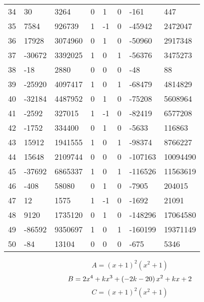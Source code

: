 \documentclass{amsart}
\begin{document}
\begin{longtable}{|l|l|l|lllll|}
34&30&3264&0&1&0&-161&447\\
35&7584&926739&1&-1&0&-45942&2472047\\
36&17928&3074960&0&1&0&-50960&2917348\\
37&-30672&3392025&1&0&1&-56376&3475273\\
38&-18&2880&0&0&0&-48&88\\
39&-25920&4097417&1&0&1&-68479&4814829\\
40&-32184&4487952&0&1&0&-75208&5608964\\
41&-2592&327015&1&-1&0&-82419&6577208\\
42&-1752&334400&0&1&0&-5633&116863\\
43&15912&1941555&1&0&1&-98374&8766227\\
44&15648&2109744&0&0&0&-107163&10094490\\
45&-37692&6865337&1&0&1&-116526&11563619\\
46&-408&58080&0&1&0&-7905&204015\\
47&12&1575&1&-1&0&-1692&21091\\
48&9120&1735120&0&1&0&-148296&17064580\\
49&-86592&9350697&1&0&1&-160199&19371149\\
50&-84&13104&0&0&0&-675&5346\\
\hline
\end{longtable}
$$A=(x
 + 1)^{2}(x^2
 + 1)$$
$$B=2\*x^4
 + k\*x^3
 + \left(-2\*k
 - 20\right) \*x^2
 + k\*x
 + 2$$
$$C=(x
 + 1)^{2}(x^2
 + 1)$$
\end{document}
